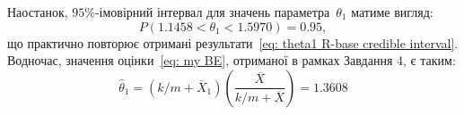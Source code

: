 Наостанок, $95\%$-імовірний інтервал для значень параметра~$\theta_1$ матиме вигляд:
\begin{equation}\label{eq: theta1 R-jags credible interval}
    P(1.1458 < \theta_1 < 1.5970) = 0.95,
\end{equation}
що практично повторює отримані результати~\eqref{eq: theta1 R-base credible interval}. Водночас, значення оцінки~\eqref{eq: my BE}, отриманої в рамках Завдання 4, є таким:
\begin{equation}\label{eq: R-jags theta star estimation}
    \widehat{\theta}_1 = \left( k/m+\overline{X}_1 \right)\left( \frac{\overline{X}}{k/m+\overline{X}} \right) = 1.3608
\end{equation}
